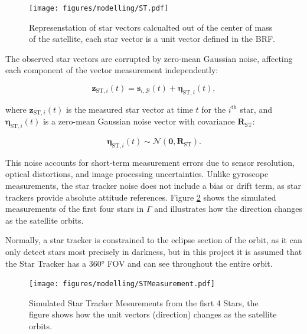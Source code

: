 \begin{figure}[H]
    \centering
    \texttt{[image: figures/modelling/ST.pdf]}
    \caption{Represenstation of star vectors calcualted out of the center of mass of the satellite, each star vector is a unit vector defined in the BRF.}
    \label{fig:ST}
\end{figure}


\noindent The observed star vectors are corrupted by zero-mean Gaussian noise, affecting each component of the vector measurement independently:

\begin{equation}
    \mathbf{z}_{\text{ST},i}(t) = \mathbf{s}_{i,\mathcal{B}}(t) + \boldsymbol{\eta}_{\text{ST},i}(t),
\end{equation}

\noindent where \(\mathbf{z}_{\text{ST},i}(t)\) is the measured star vector at time \(t\) for the \(i^\text{th}\) star, and \(\boldsymbol{\eta}_{\text{ST},i}(t)\) is a zero-mean 
Gaussian noise vector with covariance \(\mathbf{R}_{\text{ST}}\):

\begin{equation}
    \boldsymbol{\eta}_{\text{ST},i}(t) \sim \mathcal{N}(\mathbf{0}, \mathbf{R}_{\text{ST}}).
\end{equation}

\noindent This noise accounts for short-term measurement errors due to sensor resolution, optical distortions, and image processing uncertainties. 
Unlike gyroscope measurements, the star tracker noise does not include a bias or drift term, as star trackers provide absolute attitude references. Figure \ref{fig:STM} shows the simulated measurements of the first four stars in $\Gamma$ and illustrates how the direction changes as the satellite orbits.
\vspace{0.5cm}

\noindent Normally, a star tracker is constrained to the eclipse section of the orbit, as it can only detect stars most precisely in darkness, but in this project it is assumed
that the Star Tracker has a 360° FOV and can see throughout the entire orbit.

\begin{figure}[H]
    \centering
    \texttt{[image: figures/modelling/STMeasurement.pdf]}
    \caption{Simulated Star Tracker Mesurements from the fisrt 4 Stars, the figure shows how the unit vectors (direction) changes as the satellite orbits.}
    \label{fig:STM}
\end{figure}

